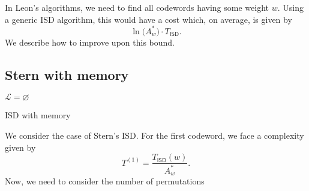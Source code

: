 In Leon's algorithms, we need to find all codewords having some weight $w$.
Using a generic ISD algorithm, this would have a cost which, on average, is given by
$$\ln\big(A_w^*\big)\cdot T_{\mathsf{ISD}}.$$
We describe how to improve upon this bound.

\subsection{Stern with memory}

\begin{algorithm}[ht]
\vspace{2mm}
$\mathcal L = \varnothing$\;
\caption{ISD with memory}
\label{alg:isd_memory}
\end{algorithm}

We consider the case of Stern's ISD.
For the first codeword, we face a complexity given by
$$T^{(1)} = \frac{T_{\mathsf{ISD}}(w)}{A_w^*}.$$
Now, we need to consider the number of permutations